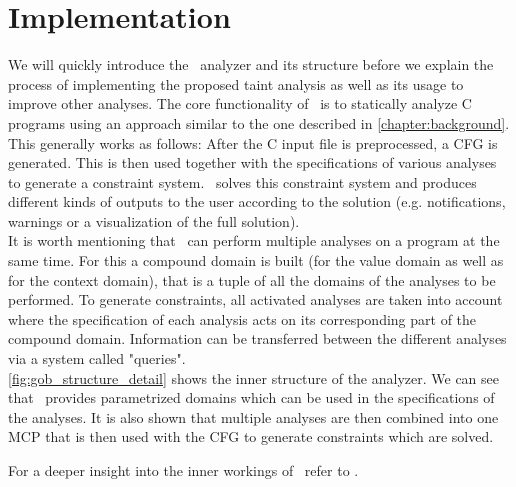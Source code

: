   \section{Implementation}
  We will quickly introduce the \gob\ analyzer and its structure before we explain the process of implementing the proposed taint analysis as well as its usage to improve other analyses. The core functionality of \gob\ is to statically analyze C programs using an approach similar to the one described in \autoref{chapter:background}. This generally works as follows: After the C input file is preprocessed, a \ac{CFG} is generated. This is then used together with the specifications of various analyses to generate a constraint system. \gob\ solves this constraint system and produces different kinds of outputs to the user according to the solution (e.g. notifications, warnings or a visualization of the full solution).\\
  It is worth mentioning that \gob\ can perform multiple analyses on a program at the same time. For this a compound domain is built (for the value domain as well as for the context domain), that is a tuple of all the domains of the analyses to be performed. To generate constraints, all activated analyses are taken into account where the specification of each analysis acts on its corresponding part of the compound domain. Information can be transferred between the different analyses via a system called "queries".\\
  \autoref{fig:gob_structure_detail} shows the inner structure of the analyzer. We can see that \gob\ provides parametrized domains which can be used in the specifications of the analyses. It is also shown that multiple analyses are then combined into one MCP that is then used with the \ac{CFG} to generate constraints which are solved.
  
  For a deeper insight into the inner workings of \gob\ refer to \parencite{apinis2014frameworks}.
  
